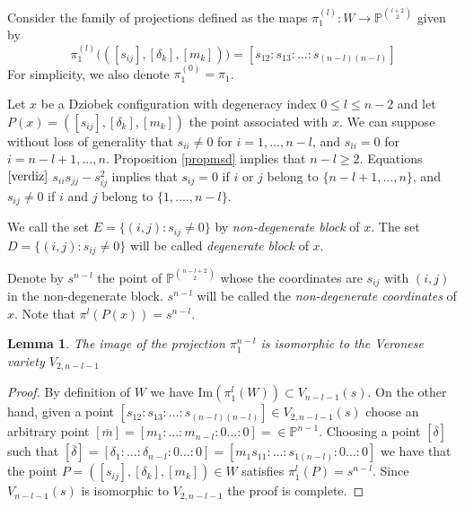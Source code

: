 \documentclass{amsart}
\newtheorem{lemma}[theorem]{Lemma}
\theoremstyle{definition}
\theoremstyle{remark}
\numberwithin{equation}{section}
\begin{document}
 
 
 Consider the family of projections defined as the maps $\pi_{1}^{(l)}: W \to \mathbb{P}^{\binom{l+2}{2}}$ given by
\[
\pi_{1}^{(l)}\big( ([s_{ij}], [\delta_k], [m_k]) \big) =  [s_{12} : s_{13} : \dots : s_{(n-l)(n-l)}]
\]
For simplicity, we also denote $\pi_{1}^{(0)} = \pi_1$. 


Let $x$ be a Dziobek configuration with degeneracy index $0 \leq l \leq n-2$ and let $P(x)=([s_{ij}], [\delta_k], [m_k])$ the point associated with $x$.  We can suppose without loss of generality that  
 $s_{ii} \neq 0$ for $i=1, \dots, n-l$, and $s_{ii} = 0$ for $i=n-l+1, \dots, n$. Proposition \ref{propmsd} implies that $n-l \geq 2$. Equations $\eqref{verdiz}$ $s_{ii}s_{jj}-s_{ij}^2$ implies that $s_{ij}=0$ if $i$ or $j$ belong to $\{n-l+1, \dots, n\}$, and $s_{ij} \neq 0$ if $i$ and $j$ belong to $\{1,....,n-l\}$. 
 
 We call the set $E=\{(i,j): s_{ij} \neq 0 \}$ by \emph{non-degenerate block} of $x$. The set  $D=\{(i,j): s_{ij} \neq 0 \}$ will be called \emph{degenerate block} of $x$.
 
 
 Denote by $s^{n-l}$ the point of $\mathbb{P}^{\binom{n-l+2}{2}}$ whose the coordinates are $s_{ij}$ with $(i,j)$ in the non-degenerate block. $s^{n-l}$ will be called the \emph{non-degenerate coordinates} of $x$. Note that $\pi^{l}(P(x))=s^{n-l}$.

\begin{lemma}
The image of the projection $\pi_{1}^{n-l}$ is isomorphic to the Veronese variety $V_{2,n-l-1}$
\end{lemma}
\begin{proof}
By definition of $W$ we have $\text{Im}(\pi_{1}^{l}(W))\subset V_{n-l-1}(s)$. On the other hand, given a point
$[s_{12} : s_{13} : \dots : s_{(n-l)(n-l)}] \in V_{2,n-l-1}(s)$ choose an arbitrary point $[\overline{m}]=[m_1:\dots: m_{n-l}:0\dots:0]= \in \mathbb{P}^{n-1}$. Choosing a point $[\overline{\delta}]$ such that $[\overline{\delta}]=[\delta_1: \dots :\delta_{n-l}:0 \ldots:0]=[m_1s_{11}:\dots:s_{1(n-l)}:0 \dots:0]$ we have that the point $P=([s_{ij}], [\delta_k], [m_k]) \in W$ satisfies $\pi_{1}^{l}(P)=s^{n-l}$. Since $V_{n-l-1}(s)$ is isomorphic to $V_{2,n-l-1}$ the proof is complete.

\end{proof}
\end{document}
